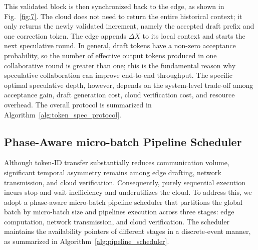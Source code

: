 \documentclass[a4paper,fleqn]{cas-dc}
\begin{document}
This validated block is then synchronized back to the edge, as shown in Fig.~\ref{fig:7}. The cloud does not need to return the entire historical context; it only returns the newly validated increment, namely the accepted draft prefix and one correction token. The edge appends $\Delta X$ to its local context and starts the next speculative round. In general, draft tokens have a non-zero acceptance probability, so the number of effective output tokens produced in one collaborative round is greater than one; this is the fundamental reason why speculative collaboration can improve end-to-end throughput. The specific optimal speculative depth, however, depends on the system-level trade-off among acceptance gain, draft generation cost, cloud verification cost, and resource overhead. The overall protocol is summarized in Algorithm~\ref{alg:token_spec_protocol}.

\subsection{Phase-Aware micro-batch Pipeline Scheduler}

Although token-ID transfer substantially reduces communication volume, significant temporal asymmetry remains among edge drafting, network transmission, and cloud verification. Consequently, purely sequential execution incurs stop-and-wait inefficiency and underutilizes the cloud. To address this, we adopt a phase-aware micro-batch pipeline scheduler that partitions the global batch by micro-batch size and pipelines execution across three stages: edge computation, network transmission, and cloud verification. The scheduler maintains the availability pointers of different stages in a discrete-event manner, as summarized in Algorithm~\ref{alg:pipeline_scheduler}.
\end{document}
